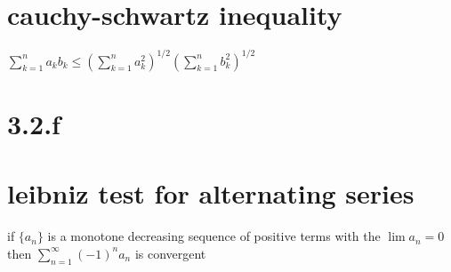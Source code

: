 \documentclass[letterpaper]{article}
\begin{document}
\section*{cauchy-schwartz inequality}
$\sum\limits_{k=1}^n{a_kb_k}\le \left(\sum\limits_{k=1}^n{a_k^2}\right)^{1/2}\left(\sum\limits_{k=1}^n{b_k^2}\right)^{1/2}$

\section*{3.2.f}

\section*{leibniz test for alternating series}
if $\{a_n\}$ is a monotone decreasing sequence of positive terms with the $\lim a_n=0$ then $\sum\limits_{n=1}^\infty{(-1)^na_n}$ is convergent
\end{document}
